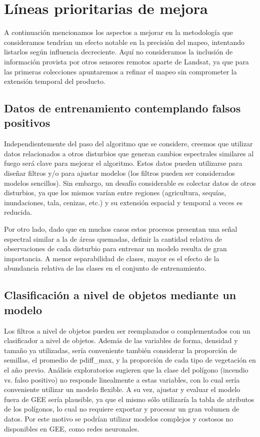 \documentclass[11pt,a4paper]{article}
\begin{document}
\section{Líneas prioritarias de mejora}

A continuación mencionamos los aspectos a mejorar en la metodología que consideramos tendrían un efecto notable en la precisión del mapeo, intentando listarlos según influencia decreciente. Aquí no consideramos la inclusión de información provista por otros sensores remotos aparte de Landsat, ya que para las primeras colecciones apuntaremos a refinar el mapeo sin comprometer la extensión temporal del producto.

\subsection{Datos de entrenamiento contemplando falsos positivos}

Independientemente del paso del algoritmo que se considere, creemos que utilizar datos relacionados a otros disturbios que generan cambios espectrales similares al fuego será clave para mejorar el algoritmo. Estos datos pueden utilizarse para diseñar filtros y/o para ajustar modelos (los filtros pueden ser considerados modelos sencillos). Sin embargo, un desafío considerable es colectar datos de otros disturbios, ya que los mismos varían entre regiones (agricultura, sequías, inundaciones, tala, cenizas, etc.) y su extensión espacial y temporal a veces es reducida. 

Por otro lado, dado que en muchos casos estos procesos presentan una señal espectral similar a la de áreas quemadas, definir la cantidad relativa de observaciones de cada disturbio para entrenar un modelo resulta de gran importancia. A menor separabilidad de clases, mayor es el efecto de la abundancia relativa de las clases en el conjunto de entrenamiento.

\subsection{Clasificación a nivel de objetos mediante un modelo}

Los filtros a nivel de objetos pueden ser reemplazados o complementados con un clasificador a nivel de objetos. Además de las variables de forma, densidad y tamaño ya utilizadas, sería conveniente también considerar la proporción de semillas, el promedio de pdiff\_max, y la proporción de cada tipo de vegetación en el año previo. Análisis exploratorios sugieren que la clase del polígono (incendio vs. falso positivo) no responde linealmente a estas variables, con lo cual sería conveniente utilizar un modelo flexible. A su vez, ajustar y evaluar el modelo fuera de GEE sería plausible, ya que el mismo sólo utilizaría la tabla de atributos de los polígonos, lo cual no requiere exportar y procesar un gran volumen de datos. Por este motivo se podrían utilizar modelos complejos y costosos no disponibles en GEE, como redes neuronales.
\end{document}
